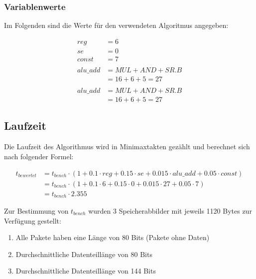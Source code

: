 \subsubsection{Variablenwerte}
\label{subsubsection:Dokumentation-BenchmarkBewertung-Berechnung-Variablen-Variablenwerte}

Im Folgenden sind die Werte für den verwendeten Algoritmus angegeben:

\begin{align*}
    reg      &= 6 \\
    se       &= 0 \\
    const    &= 7 \\ \\
    alu\_add &= MUL + AND + SR.B \\
             &= 16 + 6 + 5 = 27 \\ \\
    alu\_add &= MUL + AND + SR.B \\
             &= 16 + 6 + 5 = 27
\end{align*}

\subsection{Laufzeit}
\label{subsection:Dokumentation-BenchmarkBewertung-Berechnung-Laufzeit}

Die Laufzeit des Algorithmus wird in Minimaxtakten gezählt und berechnet sich nach folgender Formel:

\begin{align*}
    t_{bewertet} &= t_{bench} \cdot (1 + 0.1 \cdot reg + 0.15 \cdot se + 0.015 \cdot alu\_add + 0.05 \cdot const) \\
                 &= t_{bench} \cdot (1 + 0.1 \cdot 6 + 0.15 \cdot 0 + 0.015 \cdot 27 + 0.05 \cdot 7) \\
                 &= t_{bench} \cdot 2.355
\end{align*}

Zur Bestimmung von $t_{bench}$ wurden 3 Speicherabbilder mit jeweils 1120 Bytes zur Verfügung gestellt:

\begin{enumerate}
    \item Alle Pakete haben eine Länge von 80 Bits (Pakete ohne Daten)
    \item Durchschnittliche Datenteillänge von 80 Bits
    \item Durchschnittliche Datenteillänge von 144 Bits
\end{enumerate}

